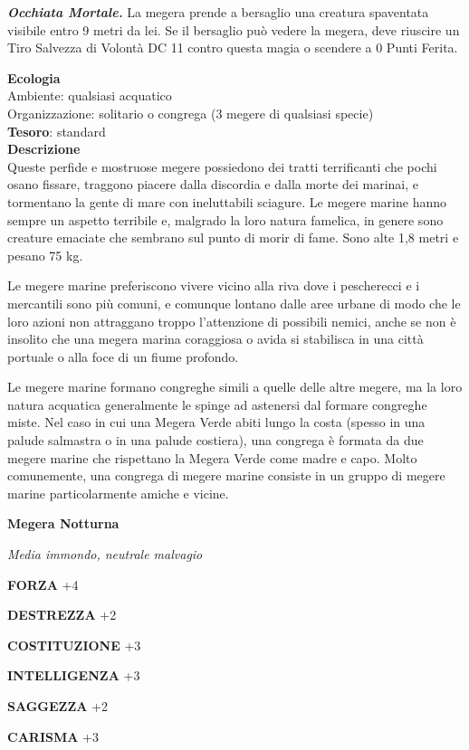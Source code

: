 \begin{multicols}{2}
	\textit{\textbf{Occhiata Mortale.}} La megera prende a bersaglio una creatura spaventata visibile entro 9 metri da lei. Se il bersaglio può vedere la megera, deve riuscire un Tiro Salvezza di Volontà DC 11 contro questa magia o scendere a 0 Punti Ferita.

	\textbf{Ecologia}\\
	Ambiente: qualsiasi acquatico\\
	Organizzazione: solitario o congrega (3 megere di qualsiasi specie)\\
	\textbf{Tesoro}: standard\\
	\textbf{Descrizione}\\
	Queste perfide e mostruose megere possiedono dei tratti terrificanti che pochi osano fissare, traggono piacere dalla discordia e dalla morte dei marinai, e tormentano la gente di mare con ineluttabili sciagure. Le megere marine hanno sempre un aspetto terribile e, malgrado la loro natura famelica, in genere sono creature emaciate che sembrano sul punto di morir di fame. Sono alte 1,8 metri e pesano 75 kg.

	Le megere marine preferiscono vivere vicino alla riva dove i pescherecci e i mercantili sono più comuni, e comunque lontano dalle aree urbane di modo che le loro azioni non attraggano troppo l'attenzione di possibili nemici, anche se non è insolito che una megera marina coraggiosa o avida si stabilisca in una città portuale o alla foce di un fiume profondo.

	Le megere marine formano congreghe simili a quelle delle altre megere, ma la loro natura acquatica generalmente le spinge ad astenersi dal formare congreghe miste. Nel caso in cui una Megera Verde abiti lungo la costa (spesso in una palude salmastra o in una palude costiera), una congrega è formata da due megere marine che rispettano la Megera Verde come madre e capo. Molto comunemente, una congrega di megere marine consiste in un gruppo di megere marine particolarmente amiche e vicine.


	\medskip{}\textbf{Megera Notturna}

	\textit{Media immondo, neutrale malvagio}

	\textbf{FORZA} +4

	\textbf{DESTREZZA} +2

	\textbf{COSTITUZIONE} +3

	\textbf{INTELLIGENZA} +3

	\textbf{SAGGEZZA} +2

	\textbf{CARISMA} +3


\end{multicols}
